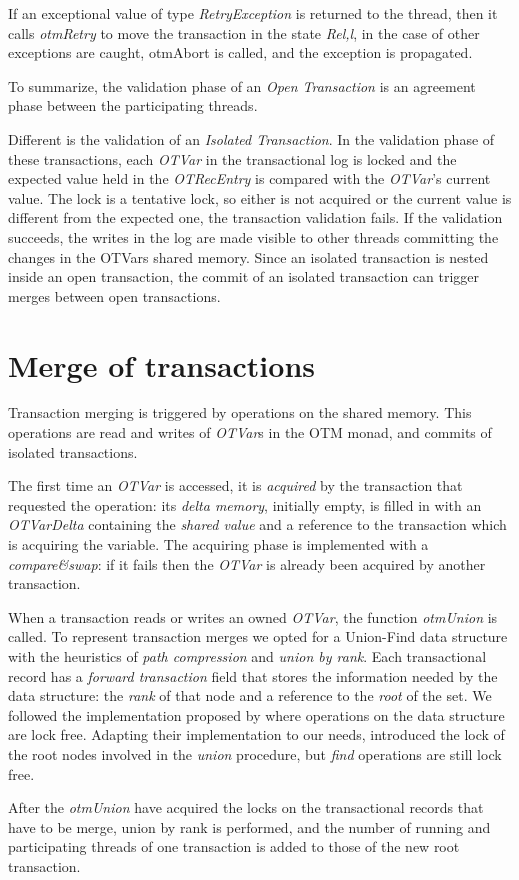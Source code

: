 If an exceptional value of type \emph{RetryException} is returned to the thread, then it calls \emph{otmRetry} to move the transaction in the state \emph{Re\textlangle l,l\textrangle}, in the case of other exceptions are caught, otmAbort is called, and the exception is propagated.

To summarize, the validation phase of an \emph{Open Transaction} is an agreement phase between the participating threads.

Different is the validation of an \emph{Isolated Transaction}.
In the validation phase of these transactions, each \emph{OTVar} in the transactional log is locked and the expected value held in the \emph{OTRecEntry} is compared with the \emph{OTVar}'s current value.
The lock is a tentative lock, so either is not acquired or the current value is different from the expected one, the transaction validation fails.
If the validation succeeds, the writes in the log are made visible to other threads committing the changes in the OTVars shared memory. Since an isolated transaction is nested inside an open transaction, the commit of an isolated transaction can trigger merges between open transactions.

\section{Merge of transactions}

Transaction merging is triggered by operations on the shared memory.
This operations are read and writes of \emph{OTVar}s in the OTM monad, and commits of isolated transactions.

The first time an \emph{OTVar} is accessed, it is \emph{acquired} by the transaction that requested the operation: its \emph{delta memory}, initially empty, is filled in with an \emph{OTVarDelta} containing the \emph{shared value} and a reference to the transaction which is acquiring the variable.
The acquiring phase is implemented with a \emph{compare\&swap}: if it fails then the \emph{OTVar} is already been acquired by another transaction.

When a transaction reads or writes an owned \emph{OTVar}, the function \emph{otmUnion} is called.
To represent transaction merges we opted for a Union-Find data structure with the heuristics of \emph{path compression} and \emph{union by rank}.
Each transactional record has a \emph{forward transaction} field that stores the information needed by the data structure: the \emph{rank} of that node and a reference to the \emph{root} of the set.
We followed the implementation proposed by \citet{Anderson94wait-freeparallel} where operations on the data structure are lock free.
Adapting their implementation to our needs, introduced the lock of the root nodes involved in the \emph{union} procedure, but \emph{find} operations are still lock free.

After the \emph{otmUnion} have acquired the locks on the transactional records that have to be merge, union by rank is performed, and the number of running and participating threads of one transaction is added to those of the new root transaction.

